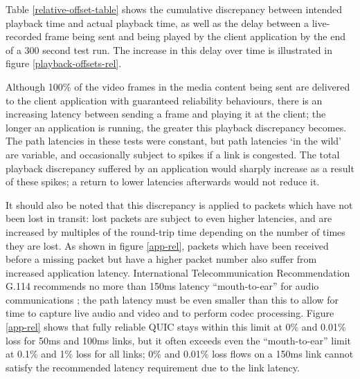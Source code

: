 \documentclass{mpaper}
\begin{document}
Table \ref{relative-offset-table} shows the cumulative discrepancy between intended playback time and actual playback time, as well as the delay between a live-recorded frame being sent and being played by the client application by the end of a 300 second test run. The increase in this delay over time is illustrated in figure \ref{playback-offsets-rel}.


Although 100\% of the video frames in the media content being sent are delivered to the client application with guaranteed reliability behaviours, there is an increasing latency between sending a frame and playing it at the client; the longer an application is running, the greater this playback discrepancy becomes. The path latencies in these tests were constant, but path latencies `in the wild' are variable, and occasionally subject to spikes if a link is congested. The total playback discrepancy suffered by an application would sharply increase as a result of these spikes; a return to lower latencies afterwards would not reduce it.


It should also be noted that this discrepancy is applied to packets which have not been lost in transit: lost packets are subject to even higher latencies, and are increased by multiples of the round-trip time depending on the number of times they are lost. As shown in figure \ref{app-rel}, packets which have been received before a missing packet but have a higher packet number also suffer from increased application latency. International Telecommunication Recommendation G.114 recommends no more than 150ms latency ``mouth-to-ear'' for audio communications \cite{ITU-REC}; the path latency must be even smaller than this to allow for time to capture live audio and video and to perform codec processing. Figure \ref{app-rel} shows that fully reliable QUIC stays within this limit at 0\% and 0.01\% loss for 50ms and 100ms links, but it often exceeds even the ``mouth-to-ear'' limit at 0.1\% and 1\% loss for all links; 0\% and 0.01\% loss flows on a 150ms link cannot satisfy the recommended latency requirement due to the link latency.
\end{document}
